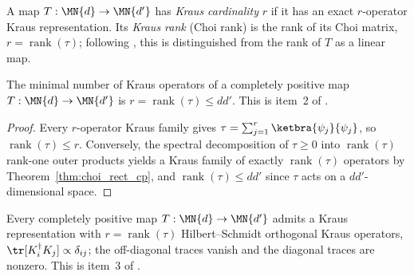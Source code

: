 \begin{definition}
    \label{def:kraus_rank_rect}
    \leanok
    A map $T:\MN{d}\to\MN{d'}$ has \emph{Kraus cardinality} $r$ if it has an
    exact $r$-operator Kraus representation. Its \emph{Kraus rank} (Choi
    rank) is the rank of its Choi matrix, $r=\operatorname{rank}(\tau)$;
    following \cite[Theorem~2.1, footnote]{Wolf2012Quantum}, this is
    distinguished from the rank of $T$ as a linear map.
\end{definition}

\begin{theorem}
    \label{thm:kraus_rect_rank_minimal}
    \leanok
    The minimal number of Kraus operators of a completely positive map
    $T:\MN{d}\to\MN{d'}$ is $r=\operatorname{rank}(\tau)\leq dd'$. This is
    item~2 of \cite[Theorem~2.1]{Wolf2012Quantum}.
\end{theorem}

\begin{proof}
    \leanok
    Every $r$-operator Kraus family gives
    $\tau=\sum_{j=1}^{r}\ketbra{\psi_j}{\psi_j}$, so
    $\operatorname{rank}(\tau)\leq r$. Conversely, the spectral
    decomposition of $\tau\geq0$ into $\operatorname{rank}(\tau)$ rank-one
    outer products yields a Kraus family of exactly
    $\operatorname{rank}(\tau)$ operators by
    Theorem~\ref{thm:choi_rect_cp}, and
    $\operatorname{rank}(\tau)\leq dd'$ since $\tau$ acts on a
    $dd'$-dimensional space.
\end{proof}

\begin{theorem}
    \label{thm:kraus_rect_orthogonal}
    \leanok
    Every completely positive map $T:\MN{d}\to\MN{d'}$ admits a Kraus
    representation with $r=\operatorname{rank}(\tau)$ Hilbert--Schmidt
    orthogonal Kraus operators, $\tr[K_i^\dagger K_j]\propto\delta_{ij}$;
    the off-diagonal traces vanish and the diagonal traces are nonzero.
    This is item~3 of \cite[Theorem~2.1]{Wolf2012Quantum}.
\end{theorem}

